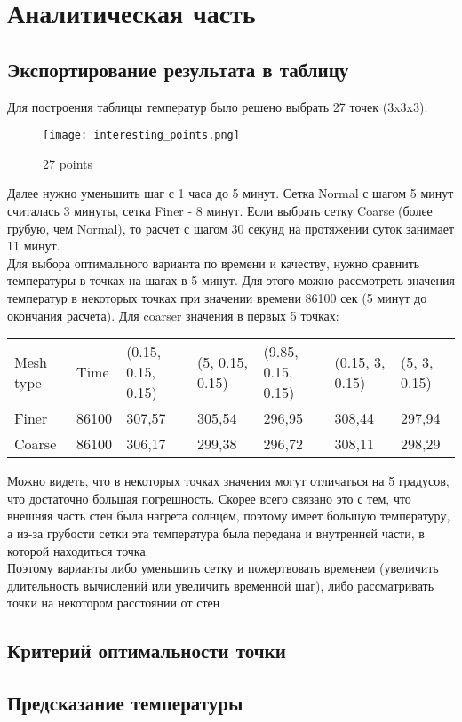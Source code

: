 \graphicspath{{./images/algo}}
\section{Аналитическая часть}

\subsection{Экспортирование результата в таблицу}

Для построения таблицы температур было решено выбрать 27 точек (3x3x3).

\begin{figure}[H]
\texttt{[image: interesting\_points.png]}
\caption{27 points}
\end{figure}

Далее нужно уменьшить шаг с 1 часа до 5 минут. Сетка Normal с шагом 5 минут считалась 3 минуты, сетка Finer - 8 минут. 
Если выбрать сетку Coarse (более грубую, чем Normal), то расчет с шагом 30 секунд на протяжении суток занимает 11 минут.\\
Для выбора оптимального варианта по времени и качеству, нужно сравнить температуры в точках на шагах в 5 минут.
Для этого можно рассмотреть значения температур в некоторых точках при значении времени 86100 сек (5 минут до окончания расчета).
Для coarser значения в первых 5 точках:\\

\begin{table}[H]
\begin{tabular}{lllllll}
Mesh type  & Time  & (0.15, 0.15, 0.15) & (5, 0.15, 0.15) & (9.85, 0.15, 0.15) & (0.15, 3, 0.15) & (5, 3, 0.15) \\
Finer & 86100 & 307,57             & 305,54          & 296,95             & 308,44          & 297,94       \\
Coarse& 86100 & 306,17             & 299,38          & 296,72             & 308,11          & 298,29       \\ 
\end{tabular}
\end{table}
Можно видеть, что в некоторых точках значения могут отличаться на 5 градусов, что достаточно большая погрешность. Скорее всего связано это с тем, что внешняя часть стен была нагрета солнцем, поэтому имеет большую температуру, а из-за грубости сетки эта температура была передана и внутренней части, в которой находиться точка.\\
Поэтому варианты либо уменьшить сетку и пожертвовать временем (увеличить длительность вычислений или увеличить временной шаг), либо рассматривать точки на некотором расстоянии от стен

\newpage


\subsection{Критерий оптимальности точки}

\subsection{Предсказание температуры}
